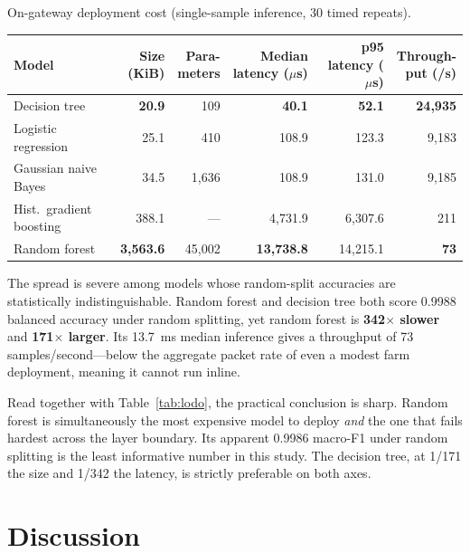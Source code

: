 \begin{wtable}
\centering
\footnotesize
\caption{On-gateway deployment cost (single-sample inference, 30 timed
repeats).}
\label{tab:edge}
\begin{fittable}
\begin{tabular}{lrrrrr}
\toprule
Model & \makecell{Size\\(KiB)} & \makecell{Para-\\meters} & \makecell{Median\\latency ($\mu$s)} &
\makecell{p95\\latency ($\mu$s)} & \makecell{Through-\\put (/s)} \\
\midrule
Decision tree            & \textbf{20.9}       & 109       & \textbf{40.1}     & \textbf{52.1} & \textbf{24{,}935} \\
Logistic regression      & 25.1                & 410       & 108.9             & 123.3 & 9{,}183 \\
Gaussian naive Bayes     & 34.5                & 1{,}636   & 108.9             & 131.0 & 9{,}185 \\
Hist.\ gradient boosting & 388.1               & ---       & 4{,}731.9         & 6{,}307.6 & 211 \\
Random forest            & \textbf{3{,}563.6}  & 45{,}002  & \textbf{13{,}738.8} & 14{,}215.1 & \textbf{73} \\
\bottomrule
\end{tabular}
\end{fittable}
\end{wtable}

The spread is severe among models whose random-split accuracies are
statistically indistinguishable. Random forest and decision tree both score
0.9988 balanced accuracy under random splitting, yet random forest is
\textbf{342$\times$ slower} and \textbf{171$\times$ larger}. Its 13.7~ms median
inference gives a throughput of 73 samples/second---below the aggregate packet
rate of even a modest farm deployment, meaning it cannot run inline.

Read together with Table~\ref{tab:lodo}, the practical conclusion is sharp.
Random forest is simultaneously the most expensive model to deploy \emph{and}
the one that fails hardest across the layer boundary. Its apparent 0.9986
macro-F1 under random splitting is the least informative number in this study.
The decision tree, at 1/171 the size and 1/342 the latency, is strictly
preferable on both axes.

\section{Discussion}

